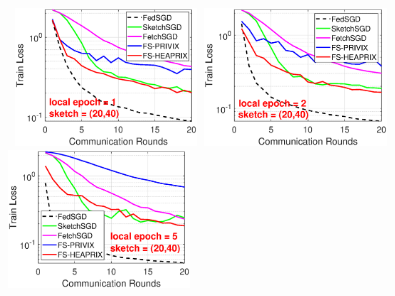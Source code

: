 \documentclass[sigconf, anonymous, review]{acmart}
\begin{document}
\begin{figure}[h]
	\begin{center}
		\mbox{%
		 \includegraphics[width=1.9in]{MNIST_figures/local1_sketch20_iid1_train_loss.eps} 
		\includegraphics[width=1.9in]{MNIST_figures/local2_sketch20_iid1_train_loss.eps} 
		\includegraphics[width=1.9in]{MNIST_figures/local5_sketch20_iid1_train_loss.eps}}
		

\end{center}
\end{figure}
\end{document}
